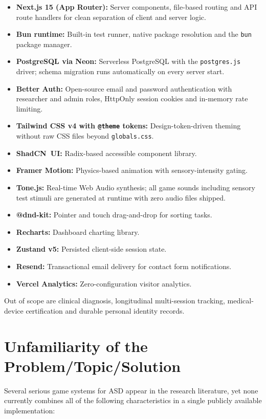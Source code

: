 \documentclass[12pt,a4paper,oneside]{report}
\begin{document}
\begin{itemize}[leftmargin=0.5in]
  \item \textbf{Next.js 15 (App Router):} Server components, file-based routing and API route handlers for clean separation of client and server logic.
  \item \textbf{Bun runtime:} Built-in test runner, native package resolution and the \texttt{bun} package manager.
  \item \textbf{PostgreSQL via Neon:} Serverless PostgreSQL with the \texttt{postgres.js} driver; schema migration runs automatically on every server start.
  \item \textbf{Better Auth:} Open-source email and password authentication with researcher and admin roles, HttpOnly session cookies and in-memory rate limiting.
  \item \textbf{Tailwind CSS v4 with \texttt{@theme} tokens:} Design-token-driven theming without raw CSS files beyond \texttt{globals.css}.
  \item \textbf{ShadCN~UI:} Radix-based accessible component library.
  \item \textbf{Framer Motion:} Physics-based animation with sensory-intensity gating.
  \item \textbf{Tone.js:} Real-time Web Audio synthesis; all game sounds including sensory test stimuli are generated at runtime with zero audio files shipped.
  \item \textbf{@dnd-kit:} Pointer and touch drag-and-drop for sorting tasks.
  \item \textbf{Recharts:} Dashboard charting library.
  \item \textbf{Zustand v5:} Persisted client-side session state.
  \item \textbf{Resend:} Transactional email delivery for contact form notifications.
  \item \textbf{Vercel Analytics:} Zero-configuration visitor analytics.
\end{itemize}

Out of scope are clinical diagnosis, longitudinal multi-session tracking, medical-device certification and durable personal identity records.

\section{Unfamiliarity of the Problem/Topic/Solution}

Several serious game systems for ASD appear in the research literature, yet none currently combines all of the following characteristics in a single publicly available implementation:
\end{document}
